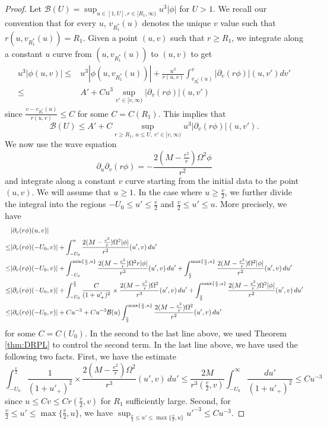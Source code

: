 \documentclass[12 pt, reqno]{amsart}
\theoremstyle{definition}
\theoremstyle{remark}
\numberwithin{equation}{section}
\newcommand{\rd}{\partial}
\newcommand{\0}{\emptyset}
\newcommand{\Omg}{\Omega}
\newcommand{\f}{\frac}
\begin{document}
\begin{proof}
Let $\mathcal B(U)=\sup_{u\in [1,U], r\in [R_1,\infty)} u^3|\phi|$ for $U > 1$.
We recall our convention that for every $u$, $v_{R_1^*}(u)$ denotes the unique $v$ value such that $r(u,v_{R_1^*}(u))=R_1$. Given a point $(u,v)$ such that $r\geq R_1$, we integrate along a constant $u$ curve from $(u,v_{R_1^*}(u))$ to $(u,v)$ to get
\begin{equation*}
\begin{split}
u^3|\phi(u,v)| \leq &u^3|\phi(u,v_{R_1^*}(u))|+\f{u^3}{r(u,v)}\int_{v_{R_1^*}(u)}^{v} |\rd_v(r\phi)|(u,v') dv'\\
\leq &A'+Cu^3\sup_{v'\in [v,\infty)} |\rd_v(r\phi)|(u,v')
\end{split}
\end{equation*}
since $\f{v-v_{R_1^*}(u)}{r(u,v)}\leq C$ for some $C=C(R_1)$. This implies that
\begin{equation}\label{B.trivial}
\mathcal B(U)\leq A'+C\sup_{r\geq R_1,\,u\leq U,\,v'\in [v,\infty)} u^3|\rd_v(r\phi)|(u,v').
\end{equation}
We now use the wave equation
$$\rd_u\rd_v (r\phi)=-\f{2(M-\f{e^2}{r})\Omg^2\phi}{r^2}$$
and integrate along a constant $v$ curve starting from the initial data to the point $(u,v)$. We will assume that $u\geq 1$. In the case where $u\geq \f v2$, we further divide the integral into the regions $-U_0 \leq u'\leq \f v2$ and $\f v2\leq u'\leq u$. More precisely, we have
\begin{align}
&|\rd_v(r\phi)(u,v)| \label{imp.decay.1} \\
\leq &|\rd_v(r\phi)(-U_0,v)|+\int_{-U_0}^u \f{2(M-\f{e^2}{r})\Omg^2|\phi|}{r^2}(u',v)\,du' \notag\\
\leq &|\rd_v(r\phi)({-U_0},v)|+\int_{-U_0}^{\min\{\f v2,u\}} \f{2(M-\f{e^2}{r})\Omg^2r|\phi|}{r^3}(u',v)\,du'+\int_{\f v2}^{\max\{\f v2,u\}} \f{2(M-\f{e^2}{r})\Omg^2|\phi|}{r^2}(u',v)\,du' \notag \\
\leq &|\rd_v(r\phi)({-U_0},v)|+\int_{-U_0}^{\f v2} \f{C}{(1+u'_{+})^2} \times\f{2(M-\f{e^2}{r})\Omg^2}{r^3}(u',v)\,du'+\int_{\f v2}^{\max\{\f v2,u\}} \f{2(M-\f{e^2}{r})\Omg^2|\phi|}{r^2}(u',v)\,du' \notag \\
\leq &|\rd_v(r\phi)({-U_0},v)|+Cu^{-3}+Cu^{-3}\mathcal B(u) \int_{\f v2}^{\max\{\f v2,u\}} \f{2(M-\f{e^2}{r})\Omg^2}{r^2}(u',v)\,du' \notag
\end{align}
for some $C=C(U_0)$. In the second to the last line above, we used Theorem \ref{thm:DRPL} to control the second term.
In the last line above, we have used the following two facts. First, we have the estimate
$$\int_{-U_0}^{\f v2} \f{1}{(1+u'_{+})^2} \times\f{2(M-\f{e^2}{r})\Omg^2}{r^3}(u',v)\,du'\leq \f{2M}{r^3(\f v2,v)} \int_{-U_0}^{\infty}\f{du'}{(1 + u'_{+})^2} \leq Cu^{-3}$$
since $u\leq Cv\leq Cr(\f v2,v)$ for $R_1$ sufficiently large. Second, for $\f v2\leq u'\leq \max\{\f v2,u\}$, we have $\sup_{\f v2\leq u'\leq \max\{\f v2,u\}}u'^{-3}\leq C u^{-3}$.


\end{proof}
\end{document}
